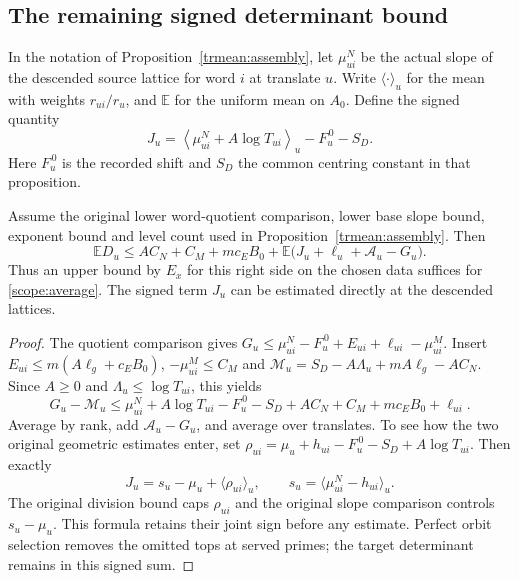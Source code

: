 \subsection{The remaining signed determinant bound}\label{geom:joint}

In the notation of Proposition~\ref{trmean:assembly}, let
\(\mu^N_{ui}\) be the actual slope of the descended source lattice
for word \(i\) at translate \(u\). Write \(\langle\cdot\rangle_u\)
for the mean with weights \(r_{ui}/r_u\), and \(\mathbb E\) for the
uniform mean on \(A_0\). Define the signed quantity
\[
 J_u=\left\langle \mu^N_{ui}+A\log T_{ui}\right\rangle_u
                       -F_u^{\,0}-S_D.
\]
Here \(F_u^{\,0}\) is the recorded shift and \(S_D\) the common
centring constant in that proposition.

\begin{proposition}\label{geom:joint-test}
Assume the original lower word-quotient comparison, lower base
slope bound, exponent bound and level count used in
Proposition~\ref{trmean:assembly}. Then
\[
 \mathbb E D_u \le A C_N+C_M+mc_EB_0+
       \mathbb E\bigl(J_u+\ell_u+\mathcal A_u-G_u\bigr).
\]
Thus an upper bound by \(E_x\) for this right side on the chosen
data suffices for \eqref{scope:average}. The signed term \(J_u\)
can be estimated directly at the descended lattices.
\end{proposition}
\begin{proof}
The quotient comparison gives
\(G_u\le\mu^N_{ui}-F_u^{\,0}+E_{ui}+\ell_{ui}-\mu^M_{ui}\).
Insert \(E_{ui}\le m(A\ell_g+c_EB_0)\), \(-\mu^M_{ui}\le C_M\)
and \(\mathcal M_u=S_D-A\Lambda_u+mA\ell_g-AC_N\).
Since \(A\ge0\) and \(\Lambda_u\le\log T_{ui}\), this yields
\[
  G_u-\mathcal M_u \le \mu^N_{ui}+A\log T_{ui}-F_u^{\,0}-S_D
                      +A C_N+C_M+mc_EB_0+\ell_{ui}.
\]
Average by rank, add \(\mathcal A_u-G_u\), and average over translates.
To see how the two original geometric estimates enter, set
\(\rho_{ui}=\mu_u+h_{ui}-F_u^{\,0}-S_D+A\log T_{ui}\). Then exactly
\[
       J_u=s_u-\mu_u+\langle \rho_{ui}\rangle_u,\qquad
       s_u=\langle\mu^N_{ui}-h_{ui}\rangle_u .
\]
The original division bound caps \(\rho_{ui}\) and the original slope
comparison controls \(s_u-\mu_u\). This formula retains their joint
sign before any estimate. Perfect orbit selection removes the
omitted tops at served primes; the target determinant remains
in this signed sum.
\end{proof}

